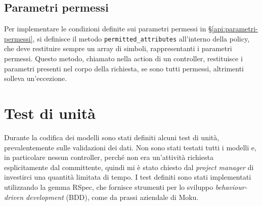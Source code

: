 \subsection{Parametri permessi}
Per implementare le condizioni definite sui parametri permessi in \S \ref{api:parametri-permessi}, si definisce il metodo \verb|permitted_attributes| all'interno della policy, che deve restituire sempre un array di simboli, rappresentanti i parametri permessi. Questo metodo, chiamato nella action di un controller, restituisce i parametri presenti nel corpo della richiesta, se sono tutti permessi, altrimenti solleva un'eccezione.


\section{Test di unità} \label{code:spec}
Durante la codifica dei modelli sono stati definiti alcuni test di unità, prevalentemente sulle validazioni dei dati. Non sono stati testati tutti i modelli e, in particolare nessun controller, perché non era un'attività richiesta esplicitamente dal committente, quindi mi è stato chiesto dal \emph{project manager} di investirci una quantità limitata di tempo. I test definiti sono stati implementati utilizzando la gemma RSpec, che fornisce strumenti per lo sviluppo \emph{behaviour-driven development} (BDD), come da prassi aziendale di Moku.
